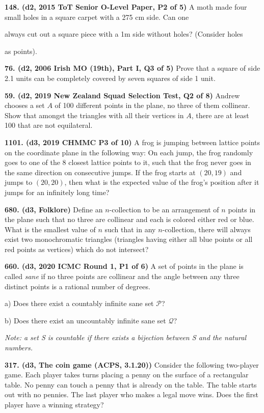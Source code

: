 \documentclass{article}
\begin{document}
\textbf{148. (\color{red}d2\color{black}, 2015 ToT Senior O-Level Paper, P2 of 5)} A moth made four small holes in a square carpet with a 275 cm side. Can one

always cut out a square piece with a 1m side without holes? (Consider holes

as points). 

\textbf{76. (\color{red}d2\color{black}, 2006 Irish MO (19th), Part I, Q3 of 5)} Prove that a square of side 2.1 units can be completely covered by seven squares of side 1 unit.

\textbf{59. (\color{red}d2\color{black}, 2019 New Zealand Squad Selection Test, Q2 of 8)} Andrew chooses a set $A$ of 100 different points in the plane, no three of them collinear. Show that amongst the triangles with all their vertices in $A$, there are at least 100 that are not equilateral.

\textbf{1101. (\color{red}d3\color{black}, 2019 CHMMC P3 of 10)} A frog is jumping between lattice points on the coordinate plane in the following way: On each jump, the frog randomly goes to one of the 8 closest lattice points to it, such that the frog never goes in the same direction on consecutive jumps. If the frog starts at $(20, 19)$ and jumps to $(20, 20)$, then what is the expected value of the frog's position after it jumps for an infinitely long time?

\textbf{680. (\color{red}d3\color{black}, Folklore)} Define an $n$-collection to be an arrangement of $n$ points in the plane such that no three are collinear and each is colored either red or blue. What is the smallest value of $n$ such that in any $n$-collection, there will always exist two monochromatic triangles (triangles having either all blue points or all red points as vertices) which do not intersect?

\textbf{660. (\color{red}d3\color{black}, 2020 ICMC Round 1, P1 of 6)} A set of points in the plane is called \emph{sane} if no three points are collinear and the angle between any three distinct points is a rational number of degrees.

a) Does there exist a countably infinite sane set $\mathcal{P}$?

b) Does there exist an uncountably infinite sane set $\mathcal{Q}$?

\emph{Note: a set S is countable if there exists a bijection between S and the natural numbers.}

\textbf{317. (\color{red}d3\color{black}, The coin game (ACPS, 3.1.20))} Consider the following two-player game. Each player takes turns placing a penny on the surface of a rectangular table. No penny can touch a penny that is already on the table. The table starts out with no pennies. The last player who makes a legal move wins. Does the first player have a winning strategy?
\end{document}

